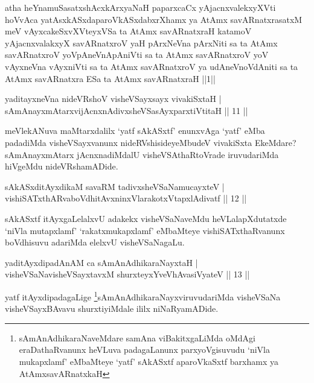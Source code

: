 \begin{shl}
atha heYnamuSasatxshAcxkArxyaNaH paparxcaCx yAjacnxvalekxyXVti hoVvAca yatAsxkASxdaparoVkASxdabxrXhamx ya AtAmx savARnatxrasatxM meV vAyxcakeSxvXVteyxVSa ta AtAmx savARnatxraH katamoV yAjacnxvalakxyX savARnatxroV yaH pArxNeVna pArxNiti sa ta AtAmx savARnatxroV yoV\s pAneVnApAniVti sa ta AtAmx savARnatxroV yoV vAyxneVna vAyxniVti sa ta AtAmx savARnatxroV ya udAneVnoVdAniti sa ta AtAmx savARnatxra ESa ta AtAmx savARnatxraH ||1||
\end{shl}


\begin{shl}
yaditayxneVna nideVRshoV visheVSayxsayx vivakiSxtaH |\\
sAmAnayxmAtarxvijAcnxnAdivxsheVSasAyxparxtiVtitaH \hfill || 11 ||
\end{shl}

\begin{artha}
meVlekANuva maMtarxdalilx `yatf sAkASxtf' enunxvAga `yatf' eMba padadiMda visheVSayxvanunx nideRVshisideyeMbudeV vivakiSxta EkeMdare? sAmAnayxmAtarx jAcnxnadiMdalU visheVSAthaRtoVrade iruvudariMda hiVgeMdu nideVRshamADide.
\end{artha}

\begin{shl}
sAkASxditAyxdikaM savaRM tadivxsheVSaNamucayxteV |\\
vishiSATxthARvaboVdhitAvxninxVlarakotxVtapxlAdivatf \hfill || 12 ||
\end{shl}

\begin{artha}
sAkASxtf itAyxgaLelalxvU adakekx visheVSaNaveMdu heVLalapXdutatxde `niVla mutapxlamf' `rakatxmukapxlamf' eMbaMteye vishiSATxthaRvanunx boVdhisuvu adariMda elelxvU visheVSaNagaLu.
\end{artha}

\begin{shl}
yaditAyxdipadAnAM ca sAmAnAdhikaraNayxtaH |\\
visheVSaNavisheVSayxtavxM shurxteyxYveVhAvasiVyateV \hfill || 13 ||
\end{shl}

\begin{artha}
yatf itAyxdipadagaLige \footnote{sAmAnAdhikaraNaveMdare samAna viBakitxgaLiMda oMdAgi eraDathaRvanunx heVLuva padagaLanunx parxyoVgisuvudu `niVla mukapxlamf' eMbaMteye `yatf' sAkASxtf aparoVkaSxtf barxhamx ya AtAmxsavARnatxkaH}sAmAnAdhikaraNayxviruvudariMda visheVSaNa visheVSayxBAvavu shurxtiyiMdale ililx niNaRyamADide.
\end{artha}

